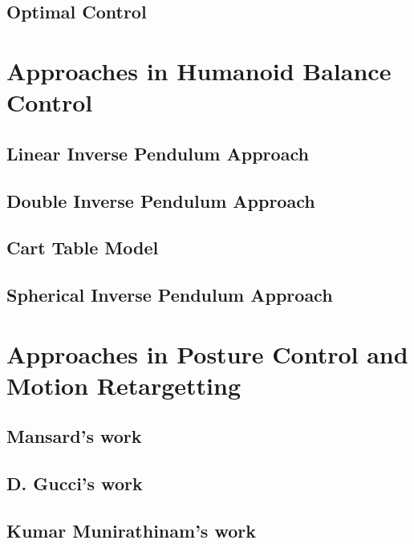 \subsection{Optimal Control}

\section{Approaches in Humanoid Balance Control}
\subsection{Linear Inverse Pendulum Approach}
\subsection{Double Inverse Pendulum Approach}
\subsection{Cart Table Model}
\subsection{Spherical Inverse Pendulum Approach}

\section{Approaches in Posture Control and Motion Retargetting}
\subsection{Mansard's work}
\subsection{D. Gucci's work}
\subsection{Kumar Munirathinam's work}

